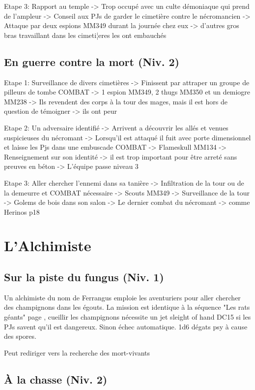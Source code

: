 Etape 3: Rapport au temple
 -> Trop occupé avec un culte démoniaque qui prend de l'ampleur
 -> Conseil aux PJs de garder le cimetière contre le nécromancien
 -> Attaque par deux espions MM349 durant la journée chez eux -> d'autres gros bras travaillant dans les cimeti¦eres les ont embauchés


\subsection{En guerre contre la mort (Niv. 2)}

Etape 1: Surveillance de divers cimetières
 -> Finissent par attraper un groupe de pilleurs de tombe COMBAT -> 1 espion MM349, 2 thugs MM350 et un demiogre MM238 
 -> Ils revendent des corps à la tour des mages, mais il est hors de question de témoigner -> ils ont peur

Etape 2: Un adversaire identifié
 -> Arrivent a découvrir les allés et venues suspicieuses du nécromant
 -> Lorsqu'il est attaqué il fuit avec porte dimensionnel et laisse les Pjs dans une embuscade COMBAT -> Flameskull MM134
 -> Renseignement sur son identité -> il est trop important pour être arreté sans preuves en béton
 -> L'équipe passe niveau 3

Etape 3: Aller chercher l'ennemi dans sa tanière
 -> Infiltration de la tour ou de la demeurre et COMBAT nécessaire -> Scouts MM349
 -> Surveillance de la tour
 -> Golems de bois dans son salon
 -> Le dernier combat du nécromant -> comme Herinos p18

\section{L'Alchimiste}

\subsection{Sur la piste du fungus (Niv. 1)}

Un alchimiste du nom de Ferrangus emploie les aventuriers pour aller chercher des champignons dans les
égouts. La mission est identique à la séquence "Les rats géants" page \pageref{ss:RatsGeants}, cueillir 
les champignons nécessite un jet sleight of hand DC15
si les PJs savent qu'il est dangereux. Sinon échec automatique. 1d6 dégats psy à cause des spores.

Peut rediriger vers la recherche des mort-vivants 

\subsection{À la chasse (Niv. 2)}

